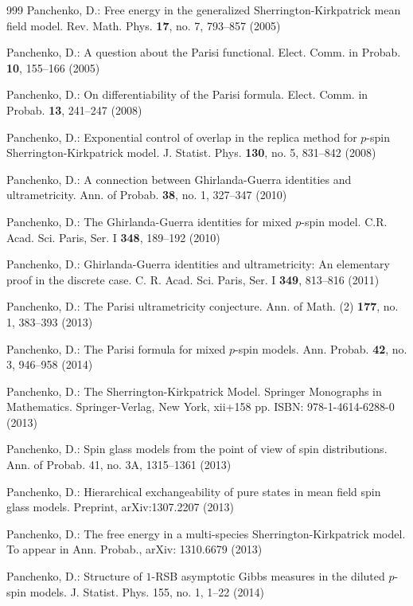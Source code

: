 \documentclass[12pt]{article}
\theoremstyle{nonumberplain}
\begin{document}
\begin{thebibliography}{999}
 Panchenko, D.: Free energy in the generalized Sherrington-Kirkpatrick mean field model. Rev. Math. Phys. \textbf{17}, no. 7, 793--857 (2005) 

 Panchenko, D.: A question about the Parisi functional. Elect. Comm. in Probab. \textbf{10}, 155--166 (2005)

 Panchenko, D.: On differentiability of the Parisi formula.  Elect. Comm. in Probab. \textbf{13}, 241--247 (2008)

 Panchenko, D.: Exponential control of overlap in the replica method for $p$-spin Sherrington-Kirkpatrick model. J. Statist. Phys. \textbf{130}, no. 5, 831--842 (2008)

 Panchenko, D.: A connection between Ghirlanda-Guerra identities and ultrametricity.  Ann. of Probab. \textbf{38}, no. 1, 327--347 (2010)

 Panchenko, D.: The Ghirlanda-Guerra identities for mixed $p$-spin model. C.R. Acad. Sci. Paris, Ser. I \textbf{348}, 189--192 (2010) 

 Panchenko, D.: Ghirlanda-Guerra identities and ultrametricity: An elementary proof in the discrete case. C. R. Acad. Sci. Paris, Ser. I \textbf{349}, 813--816 (2011)

 Panchenko, D.: The Parisi ultrametricity conjecture. Ann. of Math. (2) \textbf{177}, no. 1, 383--393 (2013)

 Panchenko, D.: The Parisi formula for mixed $p$-spin models. Ann. Probab. \textbf{42}, no. 3, 946--958 (2014)

 Panchenko, D.: The Sherrington-Kirkpatrick Model. Springer Monographs in Mathematics. Springer-Verlag, New York, xii+158 pp. ISBN:  978-1-4614-6288-0 (2013)

 Panchenko, D.: Spin glass models from the point of view of spin distributions.  Ann. of Probab.  {41}, no. 3A, 1315--1361 (2013)

 Panchenko, D.: Hierarchical exchangeability of pure states in mean field spin glass models. Preprint, arXiv:1307.2207 (2013)

 Panchenko, D.: The free energy in a multi-species Sherrington-Kirkpatrick model. To appear in Ann. Probab., arXiv: 1310.6679 (2013)

 Panchenko, D.: Structure of $1$-RSB asymptotic Gibbs measures in the diluted $p$-spin models. J. Statist. Phys. 155, no. 1, 1--22 (2014)


\end{thebibliography}
\end{document}

